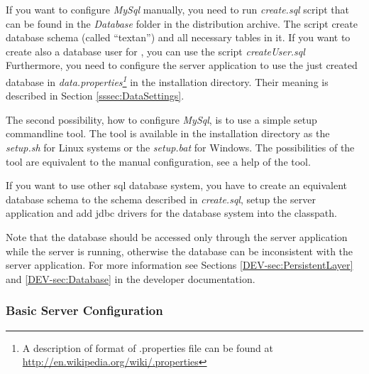 If you want to configure \emph{MySql} manually, you need to run \emph{create.sql} script
that can be found in the \emph{Database} folder in the distribution archive. The script
create database schema (called ``textan'') and all necessary  tables in it. If you
want to create also a database user for \textan{}, you can use the script \emph{createUser.sql}
Furthermore, you need to configure the server application to use the just created
database in \emph{data.properties\footnote{A description of format of .properties file can
be found at \url{http://en.wikipedia.org/wiki/.properties}}} in the installation directory.
Their meaning is described in Section \ref{sssec:DataSettings}.

The second possibility, how to configure \emph{MySql}, is to use a simple setup
commandline tool. The tool is available in the installation directory as
the \emph{setup.sh} for Linux systems or the \emph{setup.bat} for Windows.
The possibilities of the tool are equivalent to the manual configuration, see
a help of the tool.

If you want to use other sql database system, you have to create an equivalent
database schema to the schema described in \emph{create.sql}, setup the server
application and add jdbc drivers for the database system into the classpath.

Note that the database should be accessed only through the \textan{} server application
while the server is running, otherwise the database can be inconsistent with
the server application. For more information see Sections \ref{DEV-sec:PersistentLayer}
and \ref{DEV-sec:Database} in the developer documentation.

 

\subsubsection{Basic Server Configuration}

